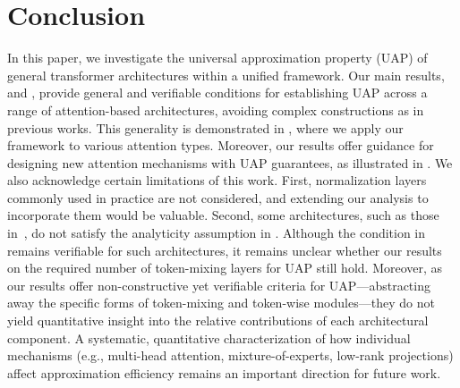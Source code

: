\documentclass{article}
\begin{document}
\section{Conclusion}
In this paper, we investigate the universal approximation property (UAP) of general transformer architectures within a unified framework. Our main results,  and , provide general and verifiable conditions for establishing UAP across a range of attention-based architectures, avoiding complex constructions as in previous works. This generality is demonstrated in , where we apply our framework to various attention types. Moreover, our results offer guidance for designing new attention mechanisms with UAP guarantees, as illustrated in .
We also acknowledge certain limitations of this work. First, normalization layers commonly used in practice are not considered, and extending our analysis to incorporate them would be valuable. Second, some architectures, such as those in~\cite{katharopoulos2020transformers}, do not satisfy the analyticity assumption in . Although the condition in  remains verifiable for such architectures, it remains unclear whether our results on the required number of token-mixing layers for UAP still hold.
Moreover, as our results offer non-constructive yet verifiable criteria for UAP—abstracting away the specific forms of token-mixing and token-wise modules—they do not yield quantitative insight into the relative contributions of each architectural component.
A systematic, quantitative characterization of how individual mechanisms (e.g., multi-head attention, mixture-of-experts, low-rank projections) affect approximation efficiency remains an important direction for future work.
\end{document}
